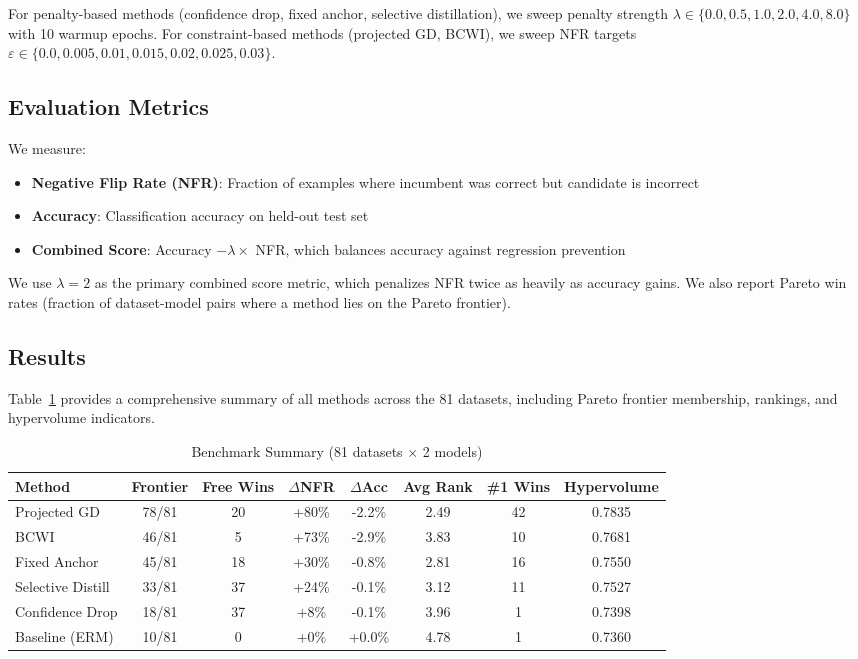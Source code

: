 \documentclass[12pt, letterpaper]{article}
\theoremstyle{remark}
\begin{document}
For penalty-based methods (confidence drop, fixed anchor, selective distillation), we sweep penalty strength $\lambda \in \{0.0, 0.5, 1.0, 2.0, 4.0, 8.0\}$ with 10 warmup epochs. For constraint-based methods (projected GD, BCWI), we sweep NFR targets $\varepsilon \in \{0.0, 0.005, 0.01, 0.015, 0.02, 0.025, 0.03\}$.

\subsection{Evaluation Metrics}

We measure:
\begin{itemize}
\item \textbf{Negative Flip Rate (NFR)}: Fraction of examples where incumbent was correct but candidate is incorrect
\item \textbf{Accuracy}: Classification accuracy on held-out test set
\item \textbf{Combined Score}: Accuracy $- \lambda \times$ NFR, which balances accuracy against regression prevention
\end{itemize}

We use $\lambda = 2$ as the primary combined score metric, which penalizes NFR twice as heavily as accuracy gains. We also report Pareto win rates (fraction of dataset-model pairs where a method lies on the Pareto frontier).

\subsection{Results}

Table~\ref{tab:summary} provides a comprehensive summary of all methods across the 81 datasets, including Pareto frontier membership, rankings, and hypervolume indicators.

\begin{table}[!htb]
\centering
\caption{Benchmark Summary (81 datasets $\times$ 2 models)}
\label{tab:summary}
\begin{tabular}{lccccccc}
\toprule
Method & Frontier & Free Wins & $\Delta$NFR & $\Delta$Acc & Avg Rank & \#1 Wins & Hypervolume \\
\midrule
Projected GD & 78/81 & 20 & +80\% & -2.2\% & 2.49 & 42 & 0.7835 \\
BCWI & 46/81 & 5 & +73\% & -2.9\% & 3.83 & 10 & 0.7681 \\
Fixed Anchor & 45/81 & 18 & +30\% & -0.8\% & 2.81 & 16 & 0.7550 \\
Selective Distill & 33/81 & 37 & +24\% & -0.1\% & 3.12 & 11 & 0.7527 \\
Confidence Drop & 18/81 & 37 & +8\% & -0.1\% & 3.96 & 1 & 0.7398 \\
Baseline (ERM) & 10/81 & 0 & +0\% & +0.0\% & 4.78 & 1 & 0.7360 \\
\bottomrule
\end{tabular}
\end{table}
\end{document}
